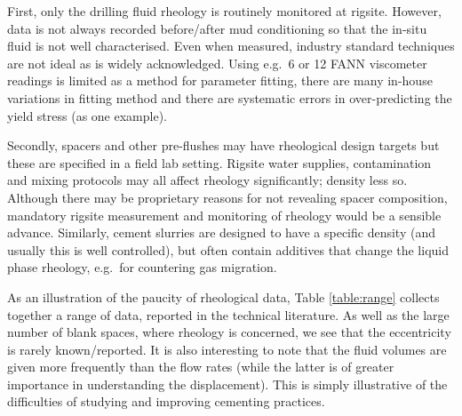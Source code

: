 \documentclass[review]{elsarticle}
\begin{document}
First, only the drilling fluid rheology is routinely monitored at rigsite. However, data is not always recorded before/after mud conditioning so that the in-situ fluid is not well characterised. Even when measured, industry standard techniques are not ideal as is widely acknowledged. Using e.g.~6 or 12 FANN viscometer readings is limited as a method for parameter fitting, there are many in-house variations in fitting method and there are systematic errors in over-predicting the yield stress (as one example).

Secondly, spacers and other pre-flushes may have rheological design targets but these are specified in a field lab setting. Rigsite water supplies, contamination and mixing protocols may all affect rheology significantly; density less so. Although there may be proprietary reasons for not revealing spacer composition, mandatory rigsite measurement and monitoring of rheology would be a sensible advance. Similarly, cement slurries are designed to have a specific density (and usually this is well controlled), but often contain additives that change the liquid phase rheology, e.g.~for countering gas migration.

As an illustration of the paucity of rheological data, Table \ref{table:range} collects together a range of data, reported in the technical literature. As well as the large number of blank spaces, where rheology is concerned, we see that the eccentricity is rarely known/reported. It is also interesting to note that the fluid volumes are given more frequently than the flow rates (while the latter is of greater importance in understanding the displacement). This is simply illustrative of the difficulties of studying and improving cementing practices.
\end{document}
